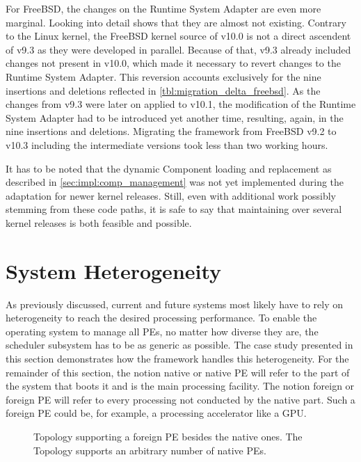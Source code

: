 For FreeBSD, the changes on the Runtime System Adapter are even more marginal. Looking into detail shows that they are almost not existing. Contrary to the Linux kernel, the FreeBSD kernel source of v10.0 is not a direct ascendent of v9.3 as they were developed in parallel. Because of that, v9.3 already included changes not present in v10.0, which made it necessary to revert changes to the Runtime System Adapter. This reversion accounts exclusively for the nine insertions and deletions reflected in \cref{tbl:migration_delta_freebsd}. As the changes from v9.3 were later on applied to v10.1, the modification of the Runtime System Adapter had to be introduced yet another time, resulting, again, in the nine insertions and deletions. Migrating the \cobas{} framework from FreeBSD v9.2 to v10.3 including the intermediate versions took less than two working hours.

It has to be noted that the dynamic Component loading and replacement as described in \cref{sec:impl:comp_management} was not yet implemented during the adaptation for newer kernel releases. Still, even with additional work possibly stemming from these code paths, it is safe to say that maintaining \cobas{} over several kernel releases is both feasible and possible.

\section{System Heterogeneity}%
\label{sec:studies:hetero}

As previously discussed, current and future systems most likely have to rely on heterogeneity to reach the desired processing performance. To enable the operating system to manage all \acp{PE}, no matter how diverse they are, the scheduler subsystem has to be as generic as possible. The case study presented in this section demonstrates how the \cobas{} framework handles this heterogeneity. For the remainder of this section, the notion native or native \ac{PE} will refer to the part of the system that boots it and is the main processing facility. The notion foreign or foreign \ac{PE} will refer to every processing not conducted by the native part. Such a foreign \ac{PE} could be, for example, a processing accelerator like a \ac{GPU}.

\begin{figure}[!b] \centering
	\caption[Topology supporting a foreign PE.]{Topology supporting a foreign PE besides the native ones. The Topology supports an arbitrary number of native PEs.}%
	\label{fig:eval:external}
\end{figure}

